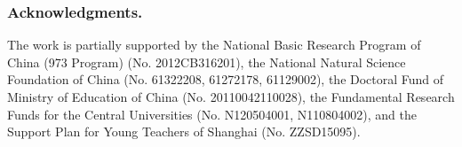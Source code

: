 \subsubsection*{Acknowledgments.}
{The work is partially supported by the National Basic Research Program of China (973 Program) (No. 2012CB316201), the National Natural Science Foundation of China (No. 61322208, 61272178, 61129002), the Doctoral Fund of Ministry of Education of China (No. 20110042110028), the Fundamental Research Funds for the Central Universities (No. N120504001, N110804002), and the Support Plan for Young Teachers of Shanghai (No. ZZSD15095).}


